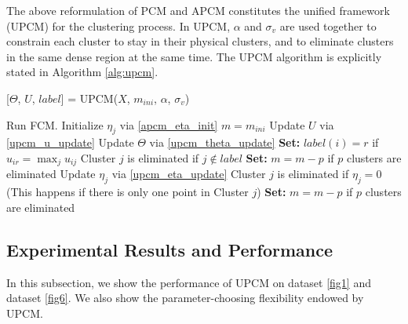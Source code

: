 \documentclass[journal,transmag]{IEEEtran}
\theoremstyle{definition}
\begin{document}
The above reformulation of PCM and APCM constitutes the unified framework (UPCM) for the clustering process. In UPCM, $\alpha$ and $\sigma_v$ are used together to constrain each cluster to stay in their physical clusters, and to eliminate clusters in the same dense region at the same time.
The UPCM algorithm is explicitly stated in Algorithm \ref{alg:upcm}.
\begin{algorithm}[H]
\caption{ [$\Theta$, $U$, $label$] = UPCM($X$, $m_{ini}$, $\alpha$, $\sigma_v$)}
\label{alg:upcm}
\begin{algorithmic}[1]
\State Run FCM.
\State Initialize $\eta_j$ via \eqref{apcm_eta_init}
\State $m=m_{ini}$
\Repeat
\State Update $U$ via \eqref{upcm_u_update}
\State Update $\Theta$ via \eqref{upcm_theta_update}
\State \textbf{Set:} $label(i)=r$ if $u_{ir}=\max_j u_{ij}$
\EndFor
\State Cluster $j$ is eliminated if $j \notin label$
\State \textbf{Set:} $m=m-p$ if  $p$ clusters are eliminated
\State Update $\eta_j$ via \eqref{upcm_eta_update}
\State Cluster $j$ is eliminated if $\eta_j=0$ (This happens if there is only one point in Cluster $j$)
\State \textbf{Set:} $m=m-p$ if  $p$ clusters are eliminated
\\
\end{algorithmic}
\end{algorithm}
\subsection{Experimental Results and Performance}
\label{sec-4-2}
In this subsection, we show the performance of UPCM on dataset \ref{fig1} and dataset \ref{fig6}. We also show the parameter-choosing flexibility endowed by UPCM.
\end{document}
